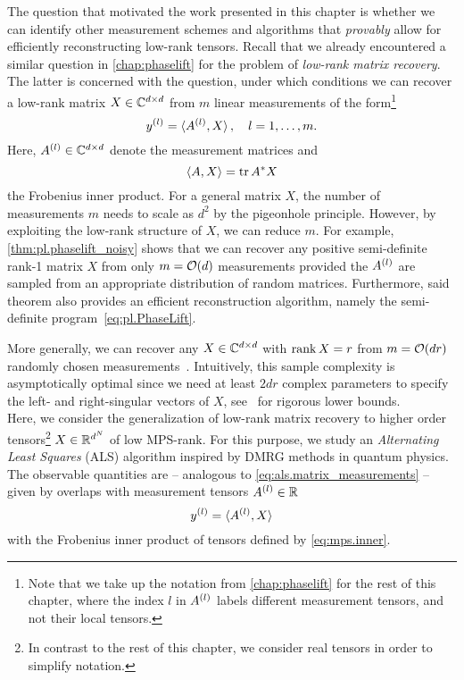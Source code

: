 The question that motivated the work presented in this chapter is whether we can identify other measurement schemes and algorithms that \emph{provably} allow for efficiently reconstructing low-rank tensors.
Recall that we already encountered a similar question in \cref{chap:phaselift} for the problem of \emph{low-rank matrix recovery}.
The latter is concerned with the question, under which conditions we can recover a low-rank matrix $X \in {\mathbb{C}}^{d \times d}$ from $m$ linear measurements of the form\footnote{%
  Note that we take up the notation from \cref{chap:phaselift} for the rest of this chapter, where the index $l$ in $A^{(l)}$ labels different measurement tensors, and not their local tensors.
}
\[
  y^{(l)} = \braket{A^{(l)}, X}, \quad l=1, \ldots, m.
  \label{eq:als.matrix_measurements}
\]
Here, $A^{(l)} \in {\mathbb{C}}^{d \times d}$ denote the measurement matrices and
\[
  \braket{A, X} = \operatorname{tr} {{A}^\ast} X
\]
the Frobenius inner product.
For a general matrix $X$, the number of measurements $m$ needs to scale as $d^2$ by the pigeonhole principle.
However, by exploiting the low-rank structure of $X$, we can reduce $m$.
For example, \cref{thm:pl.phaselift_noisy} shows that we can recover any positive semi-definite rank-1 matrix $X$ from only $m = {\mathcal{O}}(d)$ measurements provided the $A^{(l)}$ are sampled from an appropriate distribution of random matrices.
Furthermore, said theorem also provides an efficient reconstruction algorithm, namely the semi-definite program~\eqref{eq:pl.PhaseLift}.

More generally, we can recover any $X \in {\mathbb{C}}^{d \times d}$ with $\operatorname{rank} X = r$ from $m = {\mathcal{O}}(d r)$ randomly chosen measurements~\cite{Candes_2011_Tight,Kueng_2014_Low}.
Intuitively, this sample complexity is asymptotically optimal since we need at least $2 d r$ complex parameters to specify the left- and right-singular vectors of $X$, see~\cite{Eldar_2012_Uniqueness,Li_2017_Optimal} for rigorous lower bounds.\\




Here, we consider the generalization of low-rank matrix recovery to higher order tensors\footnote{%
  In contrast to the rest of this chapter, we consider real tensors in order to simplify notation.
}
$X \in {\mathbb{R}}^{d^N}$ of low MPS-rank.
For this purpose, we study an \emph{Alternating Least Squares} (ALS) algorithm inspired by DMRG methods in quantum physics.
The observable quantities are -- analogous to \cref{eq:als.matrix_measurements} -- given by overlaps with measurement tensors $A^{(l)} \in {\mathbb{R}}$
\[
  y^{(l)} = \braket{A^{(l)}, X}
  \label{eq:als.tensor_measurements}
\]
with the Frobenius inner product of tensors defined by \cref{eq:mps.inner}.

